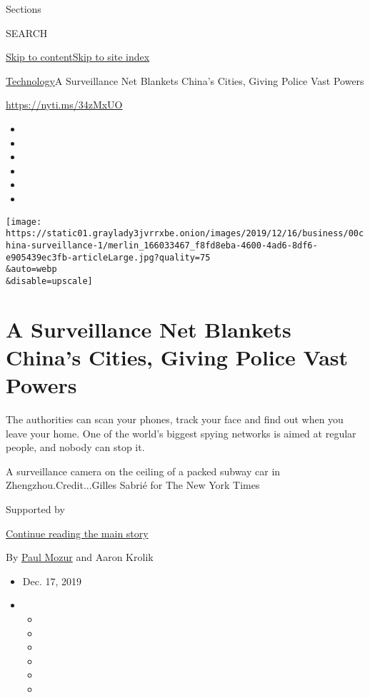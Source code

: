 Sections

SEARCH

\protect\hyperlink{site-content}{Skip to
content}\protect\hyperlink{site-index}{Skip to site index}

\href{/section/technology}{Technology}\textbar{}A Surveillance Net
Blankets China's Cities, Giving Police Vast Powers

\url{https://nyti.ms/34zMxUO}

\begin{itemize}
\item
\item
\item
\item
\item
\item
\end{itemize}

\texttt{[image: https://static01.graylady3jvrrxbe.onion/images/2019/12/16/business/00china-surveillance-1/merlin\_166033467\_f8fd8eba-4600-4ad6-8df6-e905439ec3fb-articleLarge.jpg?quality=75\\\&auto=webp\\\&disable=upscale]}

\hypertarget{a-surveillance-net-blankets-chinas-cities-giving-police-vast-powers}{%
\section{A Surveillance Net Blankets China's Cities, Giving Police Vast
Powers}\label{a-surveillance-net-blankets-chinas-cities-giving-police-vast-powers}}

The authorities can scan your phones, track your face and find out when
you leave your home. One of the world's biggest spying networks is aimed
at regular people, and nobody can stop it.

A surveillance camera on the ceiling of a packed subway car in
Zhengzhou.Credit...Gilles Sabrié for The New York Times

Supported by

\protect\hyperlink{after-sponsor}{Continue reading the main story}

By \href{https://www.nytimes3xbfgragh.onion/by/paul-mozur}{Paul Mozur}
and Aaron Krolik

\begin{itemize}
\item
  Dec. 17, 2019
\item
  \begin{itemize}
  \item
  \item
  \item
  \item
  \item
  \item
  \end{itemize}
\end{itemize}

